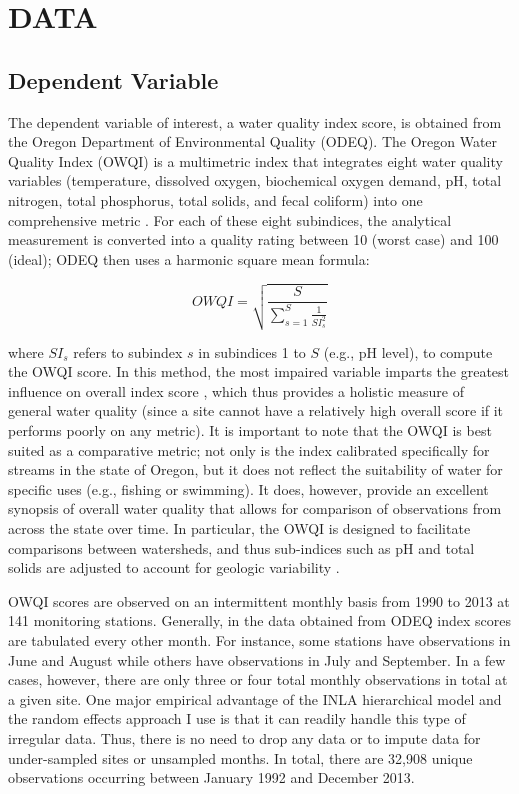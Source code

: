 \documentclass[12pt,a4paper,titlepage]{article}
\begin{document}
\section*{\bf\MakeUppercase{Data}}

\subsection*{Dependent Variable}
The dependent variable of interest, a water quality index score, is obtained from the Oregon Department of Environmental Quality (ODEQ). The Oregon Water Quality Index (OWQI) is a multimetric index that integrates eight water quality variables (temperature, dissolved oxygen, biochemical oxygen demand, pH, total nitrogen, total phosphorus, total solids, and fecal coliform) into one comprehensive metric \parencite{cude2001}. For each of these eight subindices, the analytical measurement is converted into a quality rating between 10 (worst case) and 100 (ideal); ODEQ then uses a harmonic square mean formula:

\begin{equation}
OWQI = \sqrt{\frac{S}{\sum_{s=1}^{S}\frac{1}{SI^{2}_{s}}}}
\label{eq:owqi}
\end{equation}

\noindent
where $SI_s$ refers to subindex $s$ in subindices 1 to $S$ (e.g., pH level), to compute the OWQI score. In this method, the most impaired variable imparts the greatest influence on overall index score \parencite{cude2001}, which thus provides a holistic measure of general water quality (since a site cannot have a relatively high overall score if it performs poorly on any metric). It is important to note that the OWQI is best suited as a comparative metric; not only is the index calibrated specifically for streams in the state of Oregon, but it does not reflect the suitability of water for specific uses (e.g., fishing or swimming). It does, however, provide an excellent synopsis of overall water quality that allows for comparison of observations from across the state over time. In particular, the OWQI is designed to facilitate comparisons between watersheds, and thus sub-indices such as pH and total solids are adjusted to account for geologic variability \parencite{cude2001}.

OWQI scores are observed on an intermittent monthly basis from 1990 to 2013 at 141 monitoring stations. Generally, in the data obtained from ODEQ index scores are tabulated every other month. For instance, some stations have observations in June and August while others have observations in July and September. In a few cases, however, there are only three or four total monthly observations in total at a given site. One major empirical advantage of the INLA hierarchical model and the random effects approach I use is that it can readily handle this type of irregular data. Thus, there is no need to drop any data or to impute data for under-sampled sites or unsampled months. In total, there are 32,908 unique observations occurring between January 1992 and December 2013. 
\end{document}
